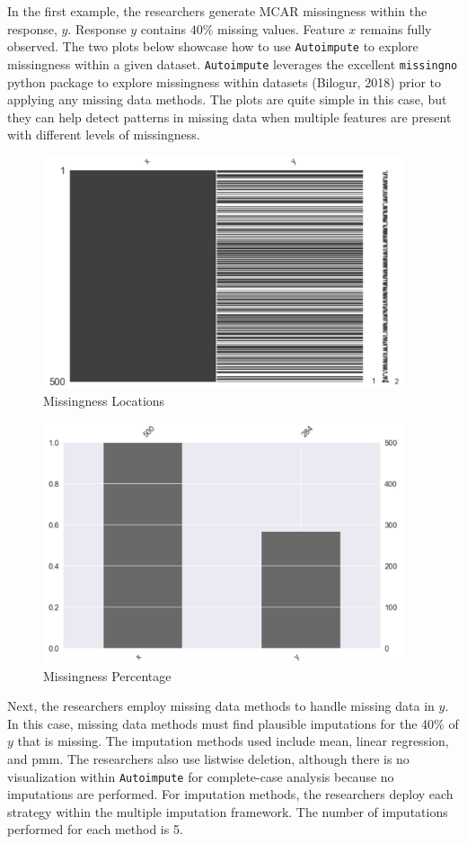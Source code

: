 \documentclass[12pt,oneside]{chicagocapstone}
\begin{document}
In the first example, the researchers generate MCAR missingness within
the response, \(y\). Response \(y\) contains 40\% missing values.
Feature \(x\) remains fully observed. The two plots below showcase how
to use \texttt{Autoimpute} to explore missingness within a given
dataset. \texttt{Autoimpute} leverages the excellent \texttt{missingno}
python package to explore missingness within datasets (Bilogur, 2018)
prior to applying any missing data methods. The plots are quite simple
in this case, but they can help detect patterns in missing data when
multiple features are present with different levels of missingness.
\begin{figure}

{\centering \includegraphics[width=400px]{figure/y-mis-forty-loc} 

}

\caption{Missingness Locations}\label{fig:y-mis-forty-loc}
\end{figure}
\begin{figure}

{\centering \includegraphics[width=400px]{figure/y-mis-forty-bar} 

}

\caption{Missingness Percentage}\label{fig:y-mis-forty-bar}
\end{figure}
Next, the researchers employ missing data methods to handle missing data
in \(y\). In this case, missing data methods must find plausible
imputations for the 40\% of \(y\) that is missing. The imputation
methods used include mean, linear regression, and pmm. The researchers
also use listwise deletion, although there is no visualization within
\texttt{Autoimpute} for complete-case analysis because no imputations
are performed. For imputation methods, the researchers deploy each
strategy within the multiple imputation framework. The number of
imputations performed for each method is 5.
\end{document}
